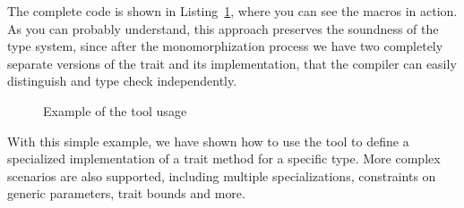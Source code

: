 The complete code is shown in Listing~\ref{fig:monomorphic_specialization_pre}, where you can see the macros in action.
As you can probably understand, this approach preserves the soundness of the type system, since after the monomorphization process we have two completely separate versions of the trait and its implementation, that the compiler can easily distinguish and type check independently.

\begin{figure}[htbp!]
	\centering
	\captionsetup{type=listing,skip=2pt}
	\caption{Example of the tool usage}
	\label{fig:monomorphic_specialization_pre}
\end{figure}

With this simple example, we have shown how to use the tool to define a specialized implementation of a trait method for a specific type.
More complex scenarios are also supported, including multiple specializations, constraints on generic parameters, trait bounds and more.